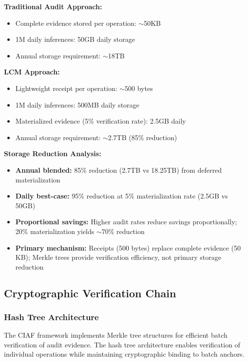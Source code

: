 \documentclass[12pt,a4paper]{article}
\begin{document}
\textbf{Traditional Audit Approach:}
\begin{itemize}
\item Complete evidence stored per operation: $\sim$50KB
\item 1M daily inferences: 50GB daily storage
\item Annual storage requirement: $\sim$18TB
\end{itemize}

\textbf{LCM Approach:}
\begin{itemize}
\item Lightweight receipt per operation: $\sim$500 bytes
\item 1M daily inferences: 500MB daily storage
\item Materialized evidence (5\% verification rate): 2.5GB daily
\item Annual storage requirement: $\sim$2.7TB (85\% reduction)
\end{itemize}

\textbf{Storage Reduction Analysis:}
\begin{itemize}
\item \textbf{Annual blended:} 85\% reduction (2.7TB vs 18.25TB) from deferred materialization
\item \textbf{Daily best-case:} 95\% reduction at 5\% materialization rate (2.5GB vs 50GB)
\item \textbf{Proportional savings:} Higher audit rates reduce savings proportionally; 20\% materialization yields $\sim$70\% reduction
\item \textbf{Primary mechanism:} Receipts (500 bytes) replace complete evidence (50 KB); Merkle trees provide verification efficiency, not primary storage reduction
\end{itemize}

\subsection{Cryptographic Verification Chain}

\subsubsection{Hash Tree Architecture}

The CIAF framework implements Merkle tree structures for efficient batch verification of audit evidence. The hash tree architecture enables verification of individual operations while maintaining cryptographic binding to batch anchors.
\end{document}
